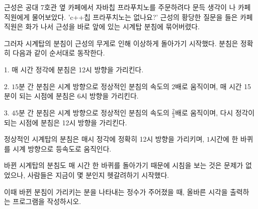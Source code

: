 근성은 공대 7호관 옆 카페에서 자바칩 프라푸치노를 주문하려다 문득 생각이 나 카페 직원에게 물어보았다. 'c++칩 프라푸치노는 없나요?' 
근성의 황당한 질문을 들은 카페 직원은 화가 나서 근성을 바로 앞에 있는 시계탑 분침에 묶어버렸다. 

그러자 시계탑의 분침이 근성의 무게로 인해 이상하게 돌아가기 시작했다. 분침은 정확히 다음과 같이 순서대로 동작한다. 

1. 매 시간 정각에 분침은 12시 방향을 가리킨다. 

2. $15$분 간 분침은 시계 방향으로 정상적인 분침의 속도의 $2$배로 움직이며, 매 시간 15분이 되는 시점에 분침은 6시 방향을 가리킨다. 

3. $45$분 간 분침은 시계 방향으로 정상적인 분침의 속도의 $\frac{2}{3}$배로 움직이며, 다시 정각이 되는 시점에 분침은 12시 방향을 가리킨다.

정상적인 시계탑의 분침은 매시 정각에 정확히 12시 방향을 가리키며, $1$시간에 한 바퀴를 시계 방향으로 등속도로 움직인다. 

바뀐 시계탑의 분침도 매 시간 한 바퀴를 돌아가기 때문에 시침을 보는 것은 문제가 없었으나, 사람들은 지금이 몇 분인지 헷갈려하기 시작했다. 

이때 바뀐 분침이 가리키는 분을 나타내는 정수가 주어졌을 때, 올바른 시각을 출력하는 프로그램을 작성하시오. 
